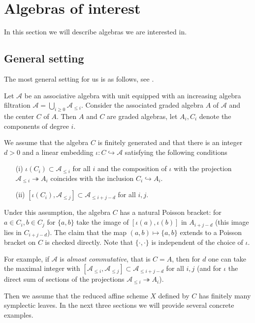 \documentclass[12pt]{amsart}
\newcommand{\A}{\mathcal{A}}
\theoremstyle{definition}
\begin{document}
\section{Algebras of interest}\label{S_alg}
In this section we will describe algebras we are interested in.
\subsection{General setting}\label{SS_gen_alg}
The most general setting for us is as follows, see \cite{Losev_App}.

Let $\A$ be an associative  algebra with unit equipped with an increasing algebra filtration
$\A=\bigcup_{i\geqslant 0}\A_{\leqslant i}$.
Consider the associated graded algebra $A$ of $\A$ and the center $C$ of $A$.
Then $A$ and $C$ are graded  algebras, let $A_i,C_i$ denote the components of degree $i$.

We assume that the algebra $C$ is finitely generated and that there is an integer $d>0$ and a linear embedding $\iota:C\hookrightarrow \A$
satisfying the following conditions
\begin{itemize}
\item[(i)] $\iota(C_i)\subset \A_{\leqslant i}$ for all $i$ and the composition of $\iota$ with the projection
$\A_{\leqslant i}\twoheadrightarrow A_i$ coincides with the inclusion $C_i\hookrightarrow A_i$.
\item[(ii)] $[\iota(C_i),\A_{\leqslant j}]\subset \A_{\leqslant i+j-d}$ for all $i,j$.
\end{itemize}

Under this assumption, the algebra $C$ has a natural Poisson bracket: for $a\in C_i, b\in C_j$ for
$\{a,b\}$ take the image of $[\iota(a),\iota(b)]$ in $A_{i+j-d}$ (this image lies in $C_{i+j-d}$).
The claim that the map $(a,b)\mapsto \{a,b\}$ extends to a Poisson bracket on $C$ is checked directly.
Note that $\{\cdot,\cdot\}$ is independent of the choice of $\iota$.

For example, if $\A$ is {\it almost commutative}, that is $C=A$, then for $d$ one can take the maximal integer
with $[\A_{\leqslant i}, \A_{\leqslant j}]\subset \A_{\leqslant i+j-d}$ for all $i,j$ (and for $\iota$ the direct sum of sections of the projections $\A_{\leqslant i}\twoheadrightarrow A_i$).

Then we assume that the reduced affine scheme $X$ defined by $C$ has finitely many symplectic leaves. In the next three sections we will provide several concrete examples.
\end{document}
